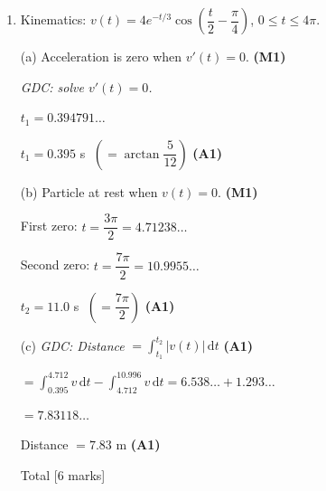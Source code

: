 \documentclass[12pt, twoside]{article}
\begin{document}
\begin{enumerate}[itemsep=0.4cm]
$\cos t = 0 \Rightarrow t = \dfrac{\pi}{2} = 1.57079\ldots$

\emph{GDC: solve $v(t) = 0$ for $0 \leq t \leq 3$.}

$t = 1.57$ s $\;\left(= \dfrac{\pi}{2}\right)$ \hfill \textbf{(A1)}

\medskip
(b) Acceleration $a(t) = v'(t)$. \hfill \textbf{(M1)}

\emph{GDC: solve $v'(t) = -1.9$ for $0 \leq t \leq 3$.}

$t_1 = 2.26277\ldots, \quad t_2 = 2.95736\ldots$

$t = 2.26$ s, \; $t = 2.96$ s \hfill \textbf{(A1)(A1)}

\medskip
(c) \emph{GDC: The speed $|v|$ is greatest at $t = 3$.} \hfill \textbf{(A1)}

$a(3) = v'(3) = -1.83778\ldots$

$a = -1.84$ m\,s$^{-2}$ \hfill \textbf{(A1)}

\hfill Total [7 marks]

\bigskip

\item Kinematics:
$v(t) = 4e^{-t/3}\cos\!\left(\dfrac{t}{2} - \dfrac{\pi}{4}\right)$,
\; $0 \leq t \leq 4\pi$.

(a) Acceleration is zero when $v'(t) = 0$. \hfill \textbf{(M1)}

\emph{GDC: solve $v'(t) = 0$.}

$t_1 = 0.394791\ldots$

$t_1 = 0.395$ s $\;\left(= \arctan\dfrac{5}{12}\right)$ \hfill \textbf{(A1)}

\medskip
(b) Particle at rest when $v(t) = 0$. \hfill \textbf{(M1)}

First zero: $t = \dfrac{3\pi}{2} = 4.71238\ldots$

Second zero: $t = \dfrac{7\pi}{2} = 10.9955\ldots$

$t_2 = 11.0$ s $\;\left(= \dfrac{7\pi}{2}\right)$ \hfill \textbf{(A1)}

\medskip
(c) \emph{GDC: Distance} $= \displaystyle\int_{t_1}^{t_2} |v(t)|\,\mathrm{d}t$
\hfill \textbf{(A1)}

$= \displaystyle\int_{0.395}^{4.712} v\,\mathrm{d}t
 - \int_{4.712}^{10.996} v\,\mathrm{d}t
= 6.538\ldots + 1.293\ldots$

$= 7.83118\ldots$

Distance $= 7.83$ m \hfill \textbf{(A1)}

\hfill Total [6 marks]

\end{enumerate}
\end{document}
